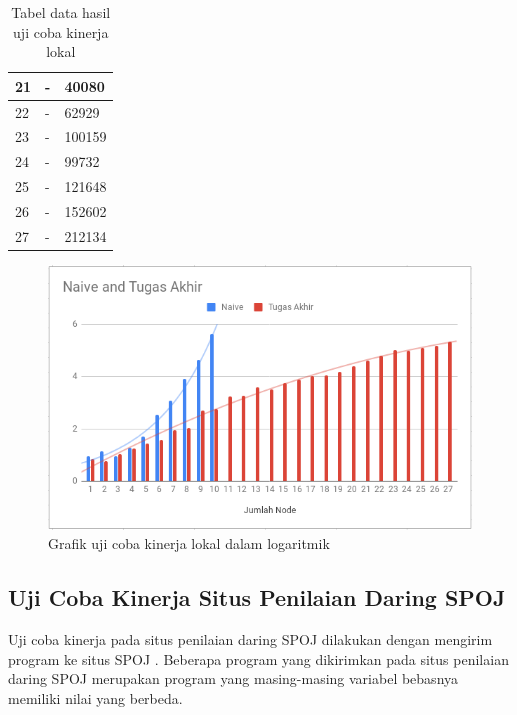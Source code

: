 \begin{table}[ht!]
\begin{tabularx}{0.6\textwidth}{|l|l|X|}
	21                           & -	          & 40080          	  \\ \hline
	22                           & -    	      & 62929          	  \\ \hline
	23                           & -        	  & 100159            \\ \hline
	24                           & -  	          & 99732          	  \\ \hline
	25                           & -     	      & 121648            \\ \hline
	26                           & -         	  & 152602            \\ \hline
	27                           & -              & 212134            \\ \hline
	\end{tabularx}
	\caption{Tabel data hasil uji coba kinerja lokal}
	\label{table:uji_coba_kinerja}
\end{table}

\begin{figure}[ht!]
	\centering\includegraphics[width=\textwidth]{bab5/figures/grafik_uji_coba_kinerja_log_new.png}
	\caption{Grafik uji coba kinerja lokal dalam logaritmik}
	\label{fig:grafik_uji_coba_kinerja}
\end{figure}

\subsection{Uji Coba Kinerja Situs Penilaian Daring SPOJ}
Uji coba kinerja pada situs penilaian daring SPOJ dilakukan dengan mengirim program ke situs SPOJ \problem\cite{PT07G}. Beberapa program yang dikirimkan pada situs penilaian daring SPOJ merupakan program yang masing-masing variabel bebasnya memiliki nilai yang berbeda.

